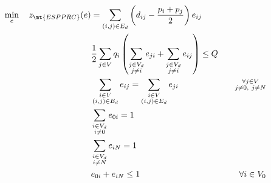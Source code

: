 \begin{align}
	\min_{e} \quad z_\mt{ESPPRC}(e) & =  \sum_{(i, j) \in E_d} \left( d_{ij} - \frac{p_i + p_j}{2} \right) e_{ij} \label{eq:espprc-obj-function}                                                                                 \\
	                                & \frac{1}{2}\sum_{j \in V} q_i \left( \sum_{\substack{j \in V_d                                                                                                                             \\ j \ne i}} e_{ji} + \sum_{\substack{j \in V_d \\ j \ne i}}  e_{ij} \right)   \le Q                                                                             & \label{eq:espprc-resource-upper-bound-constraint}                             \\
	                                & \sum_{\substack{i \in V                                                                                                                                                                    \\ (i, j) \in E_d}}       e_{ij}  = \sum_{\substack{i \in V \\ (i, j) \in E_d}} e_{ji}                                                       & \quad \substack{\forall j \in V                                             \\ j \ne 0,\ j \ne N}         \label{eq:espprc-flow-conservation-constraint-customers} \\
	                                & \sum_{\substack{i \in V_d                                                                                                                                                                  \\ i \ne 0}} e_{0i} = 1 & \label{eq:espprc-flow-conservation-constraint-depot1} \\
	                                & \sum_{\substack{i \in V_d                                                                                                                                                                  \\ i \ne N}} e_{iN} = 1 & \label{eq:espprc-flow-conservation-constraint-depot2} \\
	                                & e_{0i} + e_{iN} \le 1                                                                                      & \quad \forall i \in V_0 \label{eq:espprc-cptp-binding}                        \\

\end{align}
